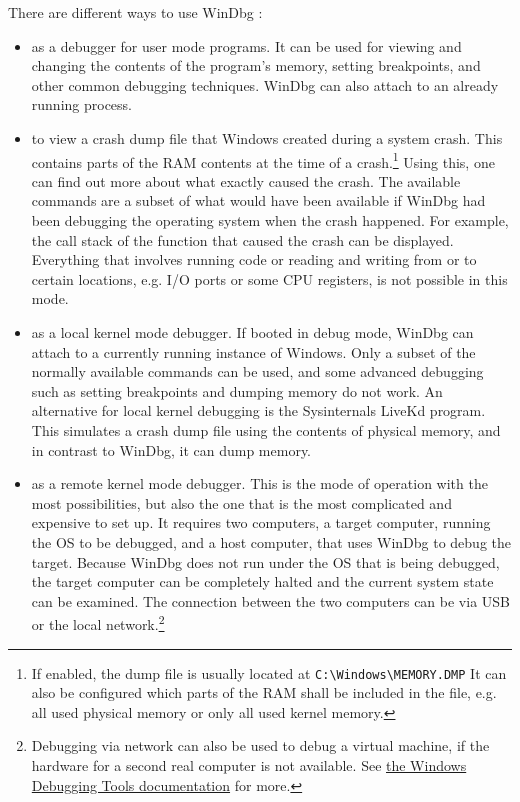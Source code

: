 There are different ways to use WinDbg \cite{Yosifovich2017}:
\begin{itemize}
	\item as a debugger for user mode programs. It can be used for viewing and changing the contents of the program's memory, setting breakpoints, and other common debugging techniques. WinDbg can also attach to an already running process.
	\item to view a crash dump file that Windows created during a system crash. This contains parts of the RAM contents at the time of a crash.\footnote{\label{fn:background.kerneldriver.crashdump} If enabled, the dump file is usually located at \texttt{C:\textbackslash Windows\textbackslash MEMORY.DMP} It can also be configured which parts of the RAM shall be included in the file, e.g. all used physical memory or only all used kernel memory.} Using this, one can find out more about what exactly caused the crash. The available commands are a subset of what would have been available if WinDbg had been debugging the operating system when the crash happened. For example, the call stack of the function that caused the crash can be displayed. Everything that involves running code or reading and writing from or to certain locations, e.g. I/O ports or some CPU registers, is not possible in this mode.
	\item as a local kernel mode debugger. If booted in debug mode, WinDbg can attach to a currently running instance of Windows. Only a subset of the normally available commands can be used, and some advanced debugging such as setting breakpoints and dumping memory do not work. An alternative for local kernel debugging is the Sysinternals LiveKd program. This simulates a crash dump file using the contents of physical memory, and in contrast to WinDbg, it can dump memory.
	\item as a remote kernel mode debugger. This is the mode of operation with the most possibilities, but also the one that is the most complicated and expensive to set up. It requires two computers, a target computer, running the OS to be debugged, and a host computer, that uses WinDbg to debug the target. Because WinDbg does not run under the OS that is being debugged, the target computer can be completely halted and the current system state can be examined. The connection between the two computers can be via USB or the local network.\footnote{\label{background.kerneldriver.vmdebugging} Debugging via network can also be used to debug a virtual machine, if the hardware for a second real computer is not available. See \href{https://docs.microsoft.com/en-us/windows-hardware/drivers/debugger/setting-up-network-debugging-of-a-virtual-machine-host}{the Windows Debugging Tools documentation} for more.}
\end{itemize}